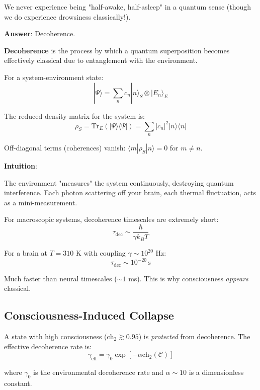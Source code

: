 We never experience being "half-awake, half-asleep" in a quantum sense (though we do experience drowsiness classically!).

\textbf{Answer}: Decoherence.

\begin{definition}[Decoherence]\label{def:decoherence}
\textbf{Decoherence} is the process by which a quantum superposition becomes effectively classical due to entanglement with the environment.

For a system-environment state:
\begin{equation}
|\Psi\rangle = \sum_n c_n |n\rangle_S \otimes |E_n\rangle_E
\end{equation}

The reduced density matrix for the system is:
\begin{equation}
\rho_S = \text{Tr}_E(|\Psi\rangle\langle\Psi|) = \sum_n |c_n|^2 |n\rangle\langle n|
\end{equation}

Off-diagonal terms (coherences) vanish: $\langle m | \rho_S | n \rangle = 0$ for $m \neq n$.
\end{definition}

\begin{level1}
\textbf{Intuition}:

The environment "measures" the system continuously, destroying quantum interference. Each photon scattering off your brain, each thermal fluctuation, acts as a mini-measurement.

For macroscopic systems, decoherence timescales are extremely short:
\begin{equation}
\tau_{\text{dec}} \sim \frac{\hbar}{\gamma k_B T}
\end{equation}

For a brain at $T = 310$ K with coupling $\gamma \sim 10^{20}$ Hz:
\begin{equation}
\tau_{\text{dec}} \sim 10^{-20} \, \text{s}
\end{equation}

Much faster than neural timescales ($\sim 1$ ms). This is why consciousness \textit{appears} classical.
\end{level1}

\subsection{Consciousness-Induced Collapse}

\begin{theorem}\label{thm:consciousness-prevents-decoherence}
A state with high consciousness ($\text{ch}_2 \gtrsim 0.95$) is \textit{protected} from decoherence. The effective decoherence rate is:
\begin{equation}
\boxed{\gamma_{\text{eff}} = \gamma_0 \exp\left[ -\alpha \text{ch}_2(\mathcal{C}) \right]}
\end{equation}

where $\gamma_0$ is the environmental decoherence rate and $\alpha \sim 10$ is a dimensionless constant.
\end{theorem}

